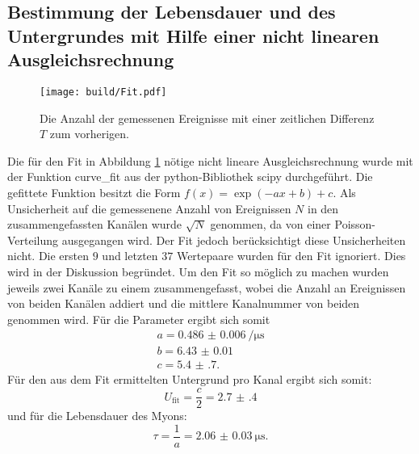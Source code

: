 \subsection{Bestimmung der Lebensdauer und des Untergrundes mit Hilfe einer nicht linearen Ausgleichsrechnung}
\label{subsec:Ausgleichs}
\begin{figure}
	\centering
	\texttt{[image: build/Fit.pdf]}
	\caption{Die Anzahl der gemessenen Ereignisse mit einer zeitlichen Differenz $T$ zum vorherigen.}
	\label{fig:zweite}
\end{figure}
Die für den Fit in Abbildung \ref{fig:zweite} nötige nicht lineare Ausgleichsrechnung wurde mit der Funktion curve\_fit aus der python-Bibliothek scipy \cite{scipy} durchgeführt. Die gefittete Funktion besitzt die Form $f(x)=\exp(-a x +b)+c$. Als Unsicherheit auf die gemessenene Anzahl von Ereignissen $N$ in den zusammengefassten Kanälen wurde $\sqrt{N}$ genommen, da von einer Poisson-Verteilung ausgegangen wird. Der Fit jedoch berücksichtigt diese Unsicherheiten nicht. Die ersten $9$ und letzten $37$ Wertepaare wurden für den Fit ignoriert. Dies wird in der Diskussion begründet. Um den Fit so möglich zu machen wurden jeweils zwei Kanäle zu einem zusammengefasst, wobei die Anzahl an Ereignissen von beiden Kanälen addiert und die mittlere Kanalnummer von beiden genommen wird. %
Für die Parameter ergibt sich somit
\begin{gather*}
a=\SI{0.486(6)}{\per\micro\second}\\
b=\num{6.43(1)}\\
c=\num{5.4(7)}.
\end{gather*}
Für den aus dem Fit ermittelten Untergrund pro Kanal ergibt sich somit:
\begin{displaymath}
	U_\text{fit}=\frac{c}{2}=\num{2.7(4)}
\end{displaymath}
und für die Lebensdauer des Myons:
\begin{displaymath}
	\tau=\frac{1}{a}=\SI{2.06(3)}{\micro\second}.
\end{displaymath}